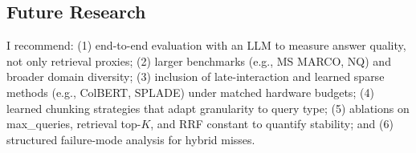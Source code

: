 \documentclass[twoside, 11pt]{article}
\begin{document}
\subsection{Future Research}
I recommend: (1) end-to-end evaluation with an LLM to measure answer quality, not only retrieval proxies; (2) larger benchmarks (e.g., MS MARCO, NQ) and broader domain diversity; (3) inclusion of late-interaction and learned sparse methods (e.g., ColBERT, SPLADE) under matched hardware budgets; (4) learned chunking strategies that adapt granularity to query type; (5) ablations on max\_queries, retrieval top-$K$, and RRF constant to quantify stability; and (6) structured failure-mode analysis for hybrid misses.



\end{document}
